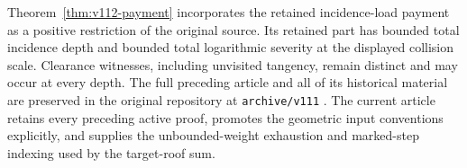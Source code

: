 \documentclass[11pt,reqno]{amsart}
\numberwithin{equation}{section}
\theoremstyle{definition}\newtheorem{definition}[theorem]{Definition}
\theoremstyle{remark}\newtheorem{remark}[theorem]{Remark}
\begin{document}
Theorem~\ref{thm:v112-payment} incorporates the retained incidence-load payment as a
positive restriction of the original source. Its retained part has
bounded total incidence depth and bounded total logarithmic severity
at the displayed collision scale. Clearance witnesses, including
unvisited tangency, remain distinct and may occur at every depth.
The full preceding article and all of its historical material are
preserved in the original repository at \texttt{archive/v111} \cite{Q111}. The current article
retains every preceding active proof, promotes the geometric input
conventions explicitly, and supplies the unbounded-weight exhaustion
and marked-step indexing used by the target-roof sum.















\appendix








\end{document}
